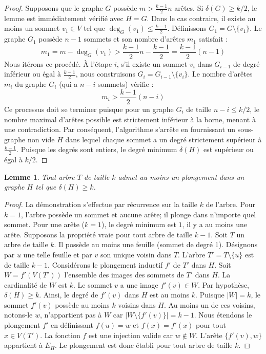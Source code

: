 \documentclass[12pt,a4paper]{article}
\newtheorem{lemma}[theorem]{Lemme}
\begin{document}
\begin{proof}
Supposons que le graphe $G$ possède $m > \frac{k-1}{2}n$ arêtes. Si $\delta(G) \geq k/2$, le lemme est immédiatement vérifié avec $H = G$.
Dans le cas contraire, il existe au moins un sommet $v_1 \in V$ tel que $\deg_G(v_1) \leq \frac{k-1}{2}$.
Définissons $G_1 = G \setminus \{v_1\}$. Le graphe $G_1$ possède $n - 1$ sommets et son nombre d'arêtes $m_1$ satisfait :
$$ m_1 = m - \deg_G(v_1) > \frac{k-1}{2}n - \frac{k-1}{2} = \frac{k-1}{2}(n - 1) $$
Nous itérons ce procédé. À l'étape $i$, s'il existe un sommet $v_i$ dans $G_{i-1}$ de degré inférieur ou égal à $\frac{k-1}{2}$, nous construisons $G_i = G_{i-1} \setminus \{v_i\}$.
Le nombre d'arêtes $m_i$ du graphe $G_i$ (qui a $n - i$ sommets) vérifie :
$$ m_i > \frac{k-1}{2}(n - i) $$
Ce processus doit se terminer puisque pour un graphe $G_i$ de taille $n-i \le k/2$, le nombre maximal d'arêtes possible est strictement inférieur à la borne, menant à une contradiction. Par conséquent, l'algorithme s'arrête en fournissant un sous-graphe non vide $H$ dans lequel chaque sommet a un degré strictement supérieur à $\frac{k-1}{2}$. Puisque les degrés sont entiers, le degré minimum $\delta(H)$ est supérieur ou égal à $k/2$.
\end{proof}

\begin{lemma}
Tout arbre $T$ de taille $k$ admet au moins un plongement dans un graphe $H$ tel que $\delta(H) \geq k$.
\end{lemma}

\begin{proof}
La démonstration s'effectue par récurrence sur la taille $k$ de l'arbre.
Pour $k=1$, l'arbre possède un sommet et aucune arête; il plonge dans n'importe quel sommet. Pour une arête ($k=1$), le degré minimum est $1$, il y a au moins une arête.
Supposons la propriété vraie pour tout arbre de taille $k-1$. Soit $T$ un arbre de taille $k$. Il possède au moins une feuille (sommet de degré 1). Désignons par $u$ une telle feuille et par $v$ son unique voisin dans $T$.
L'arbre $T' = T \setminus \{u\}$ est de taille $k-1$.
Considérons le plongement inductif $f'$ de $T'$ dans $H$. Soit $W = f'(V(T'))$ l'ensemble des images des sommets de $T'$ dans $H$. La cardinalité de $W$ est $k$.
Le sommet $v$ a une image $f'(v) \in W$. Par hypothèse, $\delta(H) \geq k$. Ainsi, le degré de $f'(v)$ dans $H$ est au moins $k$.
Puisque $|W| = k$, le sommet $f'(v)$ possède au moins $k$ voisins dans $H$. Au moins un de ces voisins, notons-le $w$, n'appartient pas à $W$ car $|W \setminus \{f'(v)\}| = k-1$.
Nous étendons le plongement $f'$ en définissant $f(u) = w$ et $f(x) = f'(x)$ pour tout $x \in V(T')$. La fonction $f$ est une injection valide car $w \notin W$. L'arête $\{f'(v), w\}$ appartient à $E_H$. Le plongement est donc établi pour tout arbre de taille $k$.
\end{proof}
\end{document}
